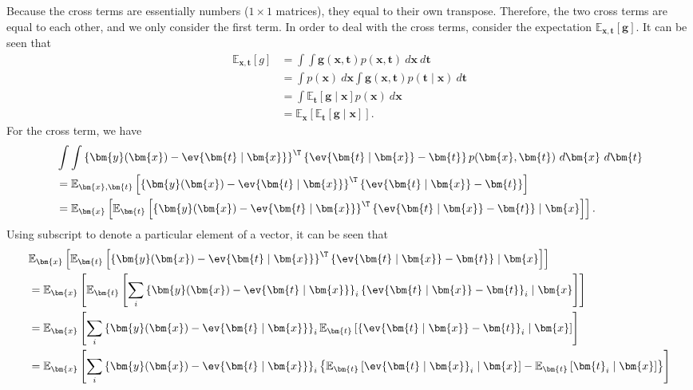 \begin{answer}{}
	
	Because the cross terms are essentially numbers ($1 \times 1$ matrices), they equal to their own transpose. Therefore, the two cross terms are equal to each other, and we only consider the first term. In order to deal with the cross terms, consider the expectation $\mathbb{E}_{\bm{x}, \bm{t}}\left[\bm{g}\right]$. It can be seen that
	\begin{align}
		\mathbb{E}_{\bm{x}, \bm{t}}\left[g\right] &= \int\int \bm{g}(\bm{x}, \bm{t}) p(\bm{x}, \bm{t})\ d\bm{x}\ d\bm{t}\\
		&= \int p(\bm{x})\ d\bm{x} \int \bm{g}(\bm{x}, \bm{t})p(\bm{t}\mid\bm{x})\ d\bm{t}\\
		&= \int \mathbb{E}_{\bm{t}}\left[\bm{g} \mid \bm{x}\right]p(\bm{x})\ d\bm{x}\\
		&= \mathbb{E}_{\bm{x}}\left[ \mathbb{E}_{\bm{t}}\left[\bm{g} \mid \bm{x}\right] \right].
	\end{align}
	For the cross term, we have
	\begin{align}
		&\int\int \left\{ \bm{y}(\bm{x}) -\ev{\bm{t} \mid \bm{x}} \right\}^{\T}\left\{ \ev{\bm{t} \mid \bm{x}} - \bm{t} \right\} p(\bm{x}, \bm{t})\ d\bm{x}\ d\bm{t}\\
		&= \mathbb{E}_{\bm{x}, \bm{t}}\left[ \left\{ \bm{y}(\bm{x}) -\ev{\bm{t} \mid \bm{x}} \right\}^{\T}\left\{ \ev{\bm{t} \mid \bm{x}} - \bm{t} \right\} \right]\\
		&= \mathbb{E}_{\bm{x}}\left[ \mathbb{E}_{\bm{t}}\left[  \left\{ \bm{y}(\bm{x}) -\ev{\bm{t} \mid \bm{x}} \right\}^{\T}\left\{ \ev{\bm{t} \mid \bm{x}} - \bm{t} \right\}  \mid \bm{x}\right] \right].
	\end{align}
	Using subscript to denote a particular element of a vector, it can be seen that
	\begin{align}
		&\mathbb{E}_{\bm{x}}\left[ \mathbb{E}_{\bm{t}}\left[  \left\{ \bm{y}(\bm{x}) -\ev{\bm{t} \mid \bm{x}} \right\}^{\T}\left\{ \ev{\bm{t} \mid \bm{x}} - \bm{t} \right\}  \mid \bm{x}\right] \right]\\
		&= \mathbb{E}_{\bm{x}}\left[ \mathbb{E}_{\bm{t}}\left[ \sum_{i}  \left\{ \bm{y}(\bm{x}) -\ev{\bm{t} \mid \bm{x}} \right\}_i \left\{ \ev{\bm{t} \mid \bm{x}} - \bm{t} \right\}_i \mid \bm{x}\right] \right]\\
		&= \mathbb{E}_{\bm{x}}\left[ \sum_{i}\left\{ \bm{y}(\bm{x}) -\ev{\bm{t} \mid \bm{x}} \right\}_i \mathbb{E}_{\bm{t}}\left[   \left\{ \ev{\bm{t} \mid \bm{x}} - \bm{t} \right\}_i \mid \bm{x}\right] \right]\\
		&= \mathbb{E}_{\bm{x}}\left[ \sum_{i}\left\{ \bm{y}(\bm{x}) -\ev{\bm{t} \mid \bm{x}} \right\}_i \left\{ \mathbb{E}_{\bm{t}}\left[ \ev{\bm{t} \mid \bm{x}}_i \mid \bm{x} \right] - \mathbb{E}_{\bm{t}}\left[ \bm{t}_i \mid \bm{x} \right] \right\} \right]\\

\end{align}
\end{answer}
